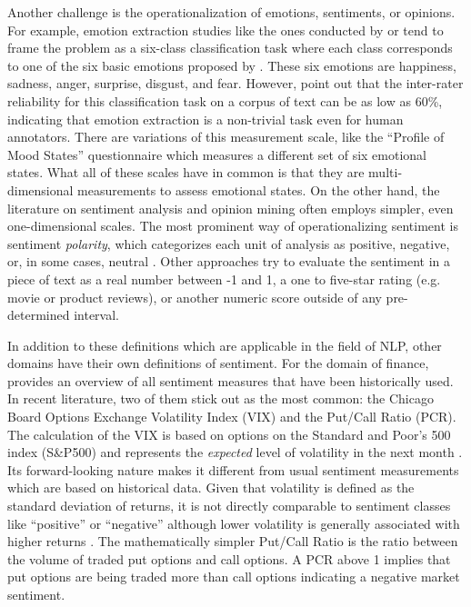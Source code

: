 Another challenge is the operationalization of emotions, sentiments, or opinions. For example, emotion extraction studies like the ones conducted by  or  tend to frame the problem as a six-class classification task where each class corresponds to one of the six basic emotions proposed by . These six emotions are happiness, sadness, anger, surprise, disgust, and fear. However,  point out that the inter-rater reliability for this classification task on a corpus of text can be as low as 60\%, indicating that emotion extraction is a non-trivial task even for human annotators. There are variations of this measurement scale, like the ``Profile of Mood States'' questionnaire  which measures a different set of six emotional states. What all of these scales have in common is that they are multi-dimensional measurements to assess emotional states. \newline
On the other hand, the literature on sentiment analysis and opinion mining often employs simpler, even one-dimensional scales. The most prominent way of operationalizing sentiment is sentiment \emph{polarity}, which categorizes each unit of analysis as positive, negative, or, in some cases, neutral \cite{ravi2015survey}. Other approaches try to evaluate the sentiment in a piece of text as a real number between -1 and 1, a one to five-star rating (e.g. movie or product reviews), or another numeric score outside of any pre-determined interval.

In addition to these definitions which are applicable in the field of NLP, other domains have their own definitions of sentiment. For the domain of finance,  provides an overview of all sentiment measures that have been historically used. In recent literature, two of them stick out as the most common: the Chicago Board Options Exchange Volatility Index (VIX) and the Put/Call Ratio (PCR). The calculation of the VIX is based on options on the Standard and Poor's 500 index (S\&P500) and represents the \emph{expected} level of volatility in the next month . Its forward-looking nature makes it different from usual sentiment measurements which are based on historical data. Given that volatility is defined as the standard deviation of returns, it is not directly comparable to sentiment classes like ``positive'' or ``negative'' although lower volatility is generally associated with higher returns . The mathematically simpler Put/Call Ratio is the ratio between the volume of traded put options and call options. A PCR above 1 implies that put options are being traded more than call options indicating a negative market sentiment.



